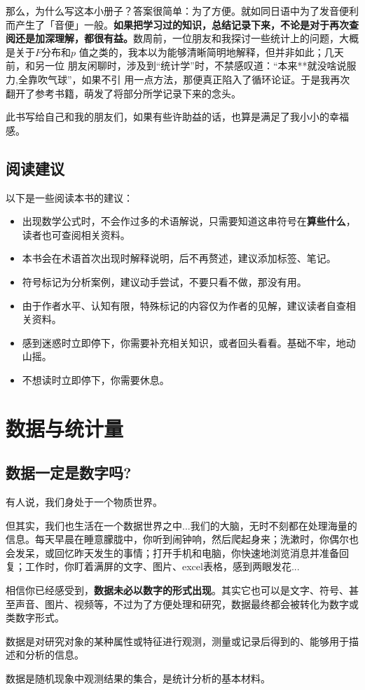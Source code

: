 \documentclass[lang=cn,10pt]{elegantbook}
\begin{document}
那么，为什么写这本小册子？答案很简单：为了方便。就如同日语中为了发音便利
而产生了「音便」一般。\textbf{如果把学习过的知识，总结记录下来，不论是对于再次查阅还是加深理解，都很有益。}数周前，一位朋友和我探讨一些统计上的问题，大概是关于$F$分布和$p$
值之类的，我本以为能够清晰简明地解释，但并非如此；几天前，和另一位
朋友闲聊时，涉及到“统计学”时，不禁感叹道：“本来**就没啥说服力,全靠吹气球”，如果不引
用一点方法，那便真正陷入了循环论证。于是我再次翻开了参考书籍，萌发了将部分所学记录下来的念头。

此书写给自己和我的朋友们，如果有些许助益的话，也算是满足了我小小的幸福感。


\section{阅读建议}
以下是一些阅读本书的建议：
\begin{itemize}
  \item 出现数学公式时，不会作过多的术语解说，只需要知道这串符号在\textbf{算些什么}，读者也可查阅相关资料。
  \item 本书会在术语首次出现时解释说明，后不再赘述，建议添加标签、笔记。
  \item 符号标记为分析案例，建议动手尝试，不要只看不做，那没有用。
  \item 由于作者水平、认知有限，特殊标记的内容仅为作者的见解，建议读者自查相关资料。
  \item 感到迷惑时立即停下，你需要补充相关知识，或者回头看看。基础不牢，地动山摇。
  \item 不想读时立即停下，你需要休息。
\end{itemize}






\chapter{数据与统计量}
\section{数据一定是数字吗?}
有人说，我们身处于一个物质世界。

但其实，我们也生活在一个数据世界之中...我们的大脑，无时不刻都在处理海量的信息。每天早晨在睡意朦胧中，你听到闹钟响，然后爬起身来；洗漱时，你偶尔也会发呆，或回忆昨天发生的事情；打开手机和电脑，你快速地浏览消息并准备回复；工作时，你盯着满屏的文字、图片、excel表格，感到两眼发花...

相信你已经感受到，\textbf{数据未必以数字的形式出现}。其实它也可以是文字、符号、甚至声音、图片、视频等，不过为了方便处理和研究，数据最终都会被转化为数字或类数字形式。
\begin{definition}[数据] 
数据是对研究对象的某种属性或特征进行观测，测量或记录后得到的、能够用于描述和分析的信息。

数据是随机现象中观测结果的集合，是统计分析的基本材料。
\end{definition}
\end{document}
